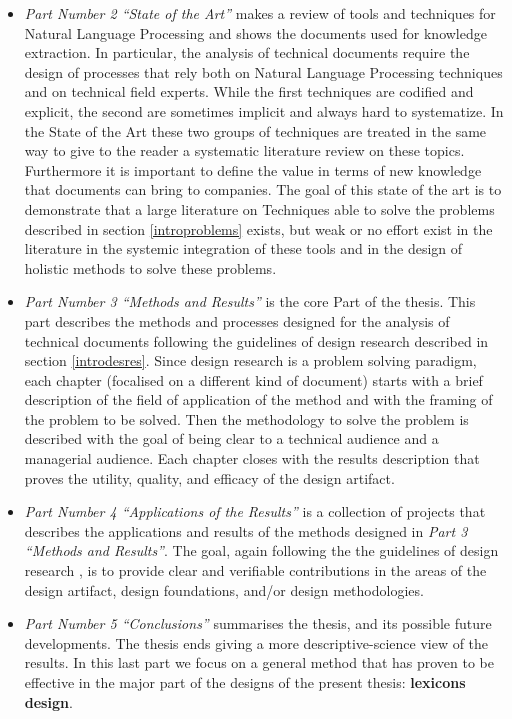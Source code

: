 \documentclass[]{book}
\theoremstyle{definition}
\theoremstyle{definition}
\theoremstyle{definition}
\theoremstyle{remark}
\begin{document}
\begin{itemize}
\item
  \emph{Part Number 2 ``State of the Art''} makes a review of tools and
  techniques for Natural Language Processing and shows the documents
  used for knowledge extraction. In particular, the analysis of
  technical documents require the design of processes that rely both on
  Natural Language Processing techniques and on technical field experts.
  While the first techniques are codified and explicit, the second are
  sometimes implicit and always hard to systematize. In the State of the
  Art these two groups of techniques are treated in the same way to give
  to the reader a systematic literature review on these topics.
  Furthermore it is important to define the value in terms of new
  knowledge that documents can bring to companies. The goal of this
  state of the art is to demonstrate that a large literature on
  Techniques able to solve the problems described in section
  \ref{introproblems} exists, but weak or no effort exist in the
  literature in the systemic integration of these tools and in the
  design of holistic methods to solve these problems.
\item
  \emph{Part Number 3 ``Methods and Results''} is the core Part of the
  thesis. This part describes the methods and processes designed for the
  analysis of technical documents following the guidelines of design
  research described in section \ref{introdesres}. Since design research
  is a problem solving paradigm, each chapter (focalised on a different
  kind of document) starts with a brief description of the field of
  application of the method and with the framing of the problem to be
  solved. Then the methodology to solve the problem is described with
  the goal of being clear to a technical audience and a managerial
  audience. Each chapter closes with the results description that proves
  the utility, quality, and efficacy of the design artifact.
\item
  \emph{Part Number 4 ``Applications of the Results''} is a collection
  of projects that describes the applications and results of the methods
  designed in \emph{Part 3 ``Methods and Results''}. The goal, again
  following the the guidelines of design research
  \citep{bichler2006design}, is to provide clear and verifiable
  contributions in the areas of the design artifact, design foundations,
  and/or design methodologies.
\item
  \emph{Part Number 5 ``Conclusions''} summarises the thesis, and its
  possible future developments. The thesis ends giving a more
  descriptive-science view of the results. In this last part we focus on
  a general method that has proven to be effective in the major part of
  the designs of the present thesis: \textbf{lexicons design}.
\end{itemize}
\end{document}
